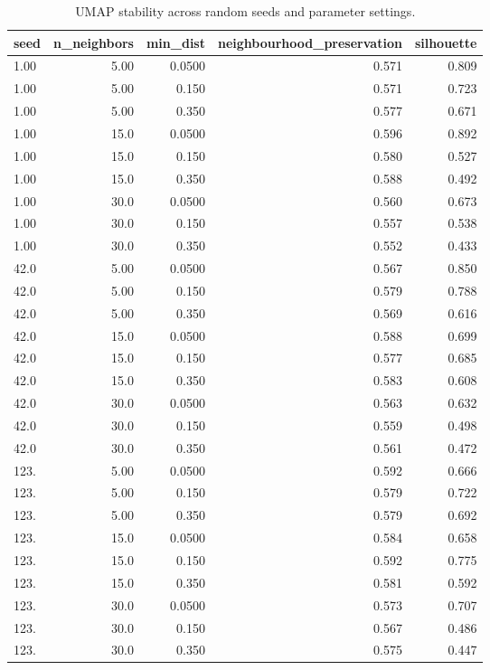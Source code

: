 \begin{table}[htbp]
\centering
\small
\caption{UMAP stability across random seeds and parameter settings.}
\label{tab:umap-stability}
\begin{tabular}{lrrrr}
\toprule
\textbf{seed} & \textbf{n\_neighbors} & \textbf{min\_dist} & \textbf{neighbourhood\_preservation} & \textbf{silhouette} \\
\midrule
1.00 & 5.00 & 0.0500 & 0.571 & 0.809 \\
1.00 & 5.00 & 0.150 & 0.571 & 0.723 \\
1.00 & 5.00 & 0.350 & 0.577 & 0.671 \\
1.00 & 15.0 & 0.0500 & 0.596 & 0.892 \\
1.00 & 15.0 & 0.150 & 0.580 & 0.527 \\
1.00 & 15.0 & 0.350 & 0.588 & 0.492 \\
1.00 & 30.0 & 0.0500 & 0.560 & 0.673 \\
1.00 & 30.0 & 0.150 & 0.557 & 0.538 \\
1.00 & 30.0 & 0.350 & 0.552 & 0.433 \\
42.0 & 5.00 & 0.0500 & 0.567 & 0.850 \\
42.0 & 5.00 & 0.150 & 0.579 & 0.788 \\
42.0 & 5.00 & 0.350 & 0.569 & 0.616 \\
42.0 & 15.0 & 0.0500 & 0.588 & 0.699 \\
42.0 & 15.0 & 0.150 & 0.577 & 0.685 \\
42.0 & 15.0 & 0.350 & 0.583 & 0.608 \\
42.0 & 30.0 & 0.0500 & 0.563 & 0.632 \\
42.0 & 30.0 & 0.150 & 0.559 & 0.498 \\
42.0 & 30.0 & 0.350 & 0.561 & 0.472 \\
123. & 5.00 & 0.0500 & 0.592 & 0.666 \\
123. & 5.00 & 0.150 & 0.579 & 0.722 \\
123. & 5.00 & 0.350 & 0.579 & 0.692 \\
123. & 15.0 & 0.0500 & 0.584 & 0.658 \\
123. & 15.0 & 0.150 & 0.592 & 0.775 \\
123. & 15.0 & 0.350 & 0.581 & 0.592 \\
123. & 30.0 & 0.0500 & 0.573 & 0.707 \\
123. & 30.0 & 0.150 & 0.567 & 0.486 \\
123. & 30.0 & 0.350 & 0.575 & 0.447 \\

\end{tabular}
\end{table}
